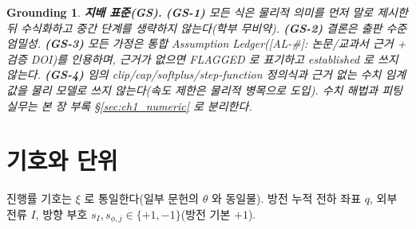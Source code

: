 \documentclass[11pt,a4paper]{article}
\newtheorem*{groundingbox}{Grounding}
\newcommand{\AL}[1]{\textsf{[AL-#1]}}
\begin{document}
\begin{groundingbox}
\textbf{지배 표준(GS).} \textbf{(GS-1)} 모든 식은 물리적 의미를 먼저 말로 제시한 뒤 수식화하고 중간
단계를 생략하지 않는다(학부 무비약). \textbf{(GS-2)} 결론은 출판 수준 엄밀성. \textbf{(GS-3)} 모든 가정은
통합 Assumption Ledger(\AL{\#}: 논문/교과서 근거 + 검증 DOI)를 인용하며, 근거가 없으면 FLAGGED 로
표기하고 established 로 쓰지 않는다. \textbf{(GS-4)} 임의 clip/cap/softplus/step-function 정의식과 근거
없는 수치 임계값을 물리 모델로 쓰지 않는다(속도 제한은 물리적 병목으로 도입). 수치 해법과 피팅 실무는
본 장 부록 \S\ref{sec:ch1_numeric} 로 분리한다.
\end{groundingbox}

\tableofcontents
\newpage

\section{기호와 단위}\label{sec:notation}
진행률 기호는 $\xi$ 로 통일한다(일부 문헌의 $\theta$ 와 동일물). 방전 누적 전하 좌표 $q$, 외부 전류 $I$,
방향 부호 $s_I,s_{\phi,j}\in\{+1,-1\}$(방전 기본 $+1$).
\end{document}
